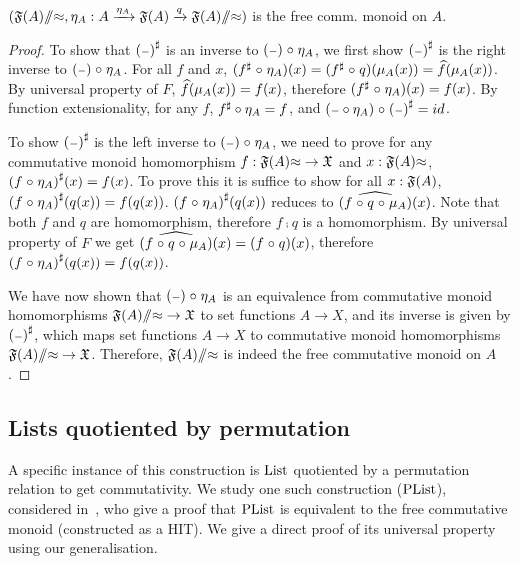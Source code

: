\begin{propositionrep}
    \label{prop:qfreemon}
    \leavevmode
    $({\mathfrak{F}(A)}{\sslash}{\approx}, \eta_A : {A \xrightarrow{\eta_A} \mathfrak{F}(A) \xrightarrow{q} {\mathfrak{F}(A)}{\sslash}{\approx}})$
    is the free comm. monoid on $A$.
\end{propositionrep}
\begin{proof}
    To show that $\ext{(\blank)}$ is an inverse to $(\blank) \comp \eta_A$,
    we first show $\ext{(\blank)}$ is the right inverse to $(\blank) \comp \eta_A$.
    For all $f$ and $x$, $({f}^{\sharp} \mathrel{\circ} \eta_A)(x) = ({f}^{\sharp} \mathrel{\circ} q)(\mu_A(x)) = \widehat{f}(\mu_A(x))$.
    By universal property of $F$, $\widehat{f}(\mu_A(x)) = f(x)$, therefore $({f}^{\sharp} \mathrel{\circ} \eta_A)(x) = f(x)$.
    By function extensionality, for any $f$, ${f}^{\sharp} \circ \eta_A = f$,
    and $(\blank \circ \eta_A) \comp \ext{(\blank)} = id$.

    To show $\ext{(\blank)}$ is the left inverse to $(\blank) \comp \eta_A$, we need to prove
    for any commutative monoid homomorphism $f : {\mathfrak{F}(A)}{\approx} \to \mathfrak{X}$ and $x : {\mathfrak{F}(A)}{\approx}$,
    ${(f \mathrel{\circ} \eta_A)}^{\sharp}(x) = f(x)$. To prove this it is suffice to show for all $x : \mathfrak{F}(A)$,
    ${(f \mathrel{\circ} \eta_A)}^{\sharp}(q(x)) = f(q(x))$.
    ${(f \mathrel{\circ} \eta_A)}^{\sharp}(q(x))$ reduces to $\widehat{(f \mathrel{\circ} q \mathrel{\circ} \mu_A)}(x)$.
    Note that both $f$ and $q$ are homomorphism, therefore $f \comp q$ is a homomorphism. By
    universal property of $F$ we get $\widehat{(f \mathrel{\circ} q \mathrel{\circ} \mu_A)}(x) = (f \mathrel{\circ} q)(x)$,
    therefore ${(f \mathrel{\circ} \eta_A)}^{\sharp}(q(x)) = f(q(x))$.

    We have now shown that $(\blank) \comp \eta_A$ is an equivalence from
    commutative monoid homomorphisms ${\mathfrak{F}(A)}{\sslash}{\approx} \to \mathfrak{X}$
    to set functions $A \to X$, and its inverse is given by $\ext{(\blank)}$, which maps set
    functions $A \to X$ to commutative monoid homomorphisms ${\mathfrak{F}(A)}{\sslash}{\approx} \to \mathfrak{X}$.
    Therefore, ${\mathfrak{F}(A)}{\sslash}{\approx}$ is indeed the free commutative monoid on $A$.
\end{proof}


\subsection{Lists quotiented by permutation}\label{cmon:plist}

A specific instance of this construction is $\List$ quotiented by a permutation relation to get commutativity.
We study one such construction ($\PList$), considered in~\cite{joramConstructiveFinalSemantics2023},
who give a proof that $\PList$ is equivalent to the free commutative monoid (constructed as a HIT).
We give a direct proof of its universal property using our generalisation.

